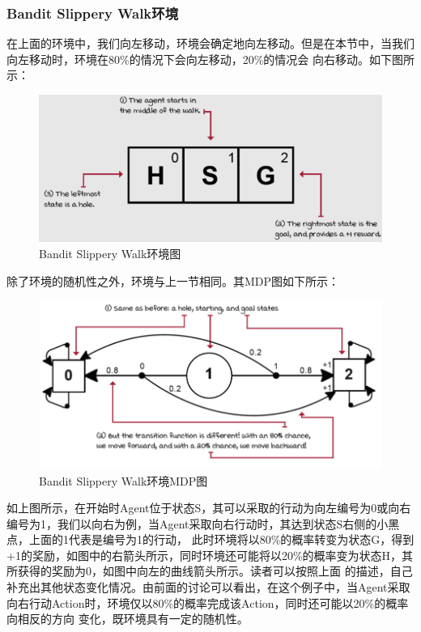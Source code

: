 \subsubsection{Bandit Slippery Walk环境}
在上面的环境中，我们向左移动，环境会确定地向左移动。但是在本节中，当我们向左移动时，环境在80\%的情况下会向左移动，20\%的情况会
向右移动。如下图所示：
\begin{figure}[H]
	\caption{Bandit Slippery Walk环境图}
	\label{p000004}
	\centering
	\includegraphics[width=15cm]{images/p000004}
\end{figure}
除了环境的随机性之外，环境与上一节相同。其MDP图如下所示：
\begin{figure}[H]
	\caption{Bandit Slippery Walk环境MDP图}
	\label{p000005}
	\centering
	\includegraphics[width=15cm]{images/p000005}
\end{figure}
如上图所示，在开始时Agent位于状态S，其可以采取的行动为向左编号为0或向右编号为1，我们以向右为例，当Agent采取向右行动时，其达到状态S右侧的小黑点，上面的1代表是编号为1的行动，
此时环境将以80\%的概率转变为状态G，得到+1的奖励，如图中的右箭头所示，同时环境还可能将以20\%的概率变为状态H，其所获得的奖励为0，如图中向左的曲线箭头所示。读者可以按照上面
的描述，自己补充出其他状态变化情况。由前面的讨论可以看出，在这个例子中，当Agent采取向右行动Action时，环境仅以80\%的概率完成该Action，同时还可能以20\%的概率向相反的方向
变化，既环境具有一定的随机性。
